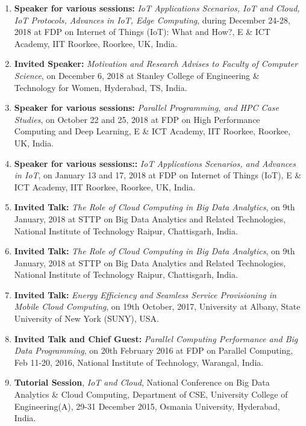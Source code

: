 \begin{enumerate}
\item
\textbf{Speaker for various sessions:} \textit{IoT Applications Scenarios, IoT and Cloud, IoT Protocols, Advances in IoT, Edge Computing}, during December 24-28, 2018 at FDP on Internet of Things (IoT): What and How?, E \& ICT Academy, IIT Roorkee, Roorkee, UK, India.

\item
\textbf{Invited Speaker:} \textit{Motivation and Research Advises to Faculty of Computer Science}, on December 6, 2018 at Stanley College of Engineering \& Technology for Women, Hyderabad, TS, India.

\item
\textbf{Speaker for various sessions:} \textit{Parallel Programming, and HPC Case Studies}, on October 22 and 25, 2018 at FDP on High Performance Computing  and Deep Learning, E \& ICT Academy, IIT Roorkee, Roorkee, UK, India.

\item
\textbf{Speaker for various sessions::} \textit{IoT Applications Scenarios, and Advances in IoT}, on January 13 and 17, 2018 at FDP on Internet of Things (IoT), E \& ICT Academy, IIT Roorkee, Roorkee, UK, India.

\item
\textbf{Invited Talk:} \textit{The Role of Cloud Computing in Big Data Analytics}, on 9th January, 2018 at STTP on Big Data Analytics and Related Technologies, National Institute of Technology Raipur, Chattisgarh, India.
\item
\textbf{Invited Talk:} \textit{The Role of Cloud Computing in Big Data Analytics}, on 9th January, 2018 at STTP on Big Data Analytics and Related Technologies, National Institute of Technology Raipur, Chattisgarh, India.
\item
\textbf{Invited Talk:} \textit{Energy Efficiency and Seamless Service Provisioning in Mobile Cloud Computing}, on 19th October, 2017, University at Albany, State University of New York (SUNY), USA. 

\item
\textbf{Invited Talk and Chief Guest:} \textit{Parallel Computing Performance and Big Data Programming}, on 20th February 2016 at FDP on Parallel Computing, Feb 11-20, 2016, National Institute of Technology, Warangal, India.

\item
\textbf{Tutorial Session}, \textit{IoT and Cloud}, National Conference on Big Data Analytics \& Cloud Computing, Department of CSE, University College of Engineering(A), 29-31 December 2015, Osmania University, Hyderabad, India.


\end{enumerate}
